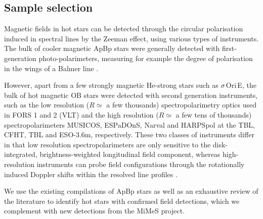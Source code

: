 \documentclass[useAMS,usenatbib]{mn2e}
\newcommand{\sigorie}{$\sigma$\,Ori\,E}
\begin{document}

\newpage
\onecolumn
		{\small }
\twocolumn

\subsection{Sample selection}
\label{sec:sample}


Magnetic fields in hot stars can be detected through the circular polarisation induced in spectral lines by the Zeeman effect, using various types of instruments. The bulk of cooler magnetic ApBp stars were generally detected with first-generation photo-polarimeters, measuring for example the degree of polarisation in the wings of a Balmer line \citep[e.g.][]{1980ApJS...42..421B}. 

However, apart from a few strongly magnetic He-strong stars such as \sigorie, the bulk of hot magnetic OB stars were detected with second generation instruments, such as the low resolution ($R\simeq$ a few thousands) spectropolarimetry optics used in FORS 1 and 2 (VLT) and the high resolution ($R\simeq$ a few tens of thousands) spectropolarimeters MUSICOS, ESPaDOnS, Narval and HARPSpol at the TBL, CFHT, TBL and ESO-3.6m, respectively. These two classes of instruments differ in that low resolution spectropolarimeters are only sensitive to the disk-integrated, brightness-weighted longitudinal field component, whereas high-resolution instruments can probe field configurations through the rotationally induced Doppler shifts within the resolved line profiles \citep[see][]{2009ARA&A..47..333D,2010arXiv1010.2248P}. 



We use the existing compilations of ApBp stars \citep[e.g.][]{2005A&A...430.1143B,2007A&A...470..685L,2008AstBu..63..139R} as well as an exhaustive review of the literature to identify hot stars with confirmed field detections, which we complement with new detections from the MiMeS project. 
\end{document}
